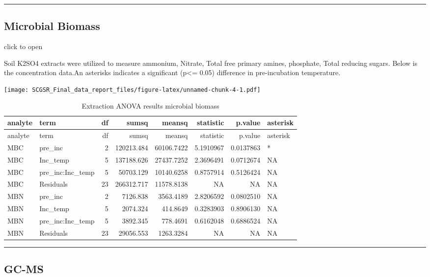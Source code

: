 \documentclass[
]{article}
\begin{document}
\begin{center}\rule{0.5\linewidth}{0.5pt}\end{center}

\hypertarget{microbial-biomass}{%
\subsection{Microbial Biomass}\label{microbial-biomass}}

click to open

Soil K2SO4 extracts were utilized to measure ammonium, Nitrate, Total
free primary amines, phosphate, Total reducing sugars. Below is the
concentration data.An asterisks indicates a significant (p\textless=
0.05) difference in pre-incubation temperature.

\texttt{[image: SCGSR\_Final\_data\_report\_files/figure-latex/unnamed-chunk-4-1.pdf]}

\begin{longtable}[]{@{}llrrrrrl@{}}
\caption{Extraction ANOVA results microbial biomass}\tabularnewline
\toprule()
analyte & term & df & sumsq & meansq & statistic & p.value & asterisk \\
\midrule()
\endfirsthead
\toprule()
analyte & term & df & sumsq & meansq & statistic & p.value & asterisk \\
\midrule()
\endhead
MBC & pre\_inc & 2 & 120213.484 & 60106.7422 & 5.1910967 & 0.0137863 &
* \\
MBC & Inc\_temp & 5 & 137188.626 & 27437.7252 & 2.3696491 & 0.0712674 &
NA \\
MBC & pre\_inc:Inc\_temp & 5 & 50703.129 & 10140.6258 & 0.8757914 &
0.5126424 & NA \\
MBC & Residuals & 23 & 266312.717 & 11578.8138 & NA & NA & NA \\
MBN & pre\_inc & 2 & 7126.838 & 3563.4189 & 2.8206592 & 0.0802510 &
NA \\
MBN & Inc\_temp & 5 & 2074.324 & 414.8649 & 0.3283903 & 0.8906130 &
NA \\
MBN & pre\_inc:Inc\_temp & 5 & 3892.345 & 778.4691 & 0.6162048 &
0.6886524 & NA \\
MBN & Residuals & 23 & 29056.553 & 1263.3284 & NA & NA & NA \\
\bottomrule()
\end{longtable}

\begin{center}\rule{0.5\linewidth}{0.5pt}\end{center}

\hypertarget{gc-ms}{%
\subsection{GC-MS}\label{gc-ms}}
\end{document}
